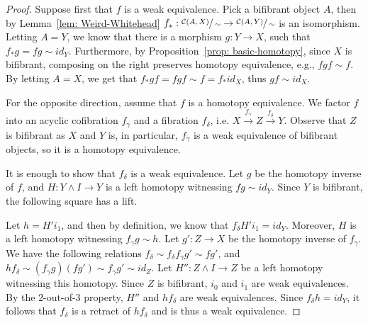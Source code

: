 \documentclass[../thesis.tex]{subfiles}
\begin{document}
            \begin{proof}
                Suppose first that $f$ is a weak equivalence. Pick a bifibrant object $A$, then by Lemma~\ref{lem: Weird-Whitehead} $f_*:\sfrac{\mathcal{C}(A,X)}{\sim}\rightarrow \sfrac{\mathcal{C}(A,Y)}{\sim}$ is an isomorphism. Letting $A = Y$, we know that there is a morphism $g: Y\rightarrow X$, such that $f_*g = fg \sim id_Y$. Furthermore, by Proposition~\ref{prop: basic-homotopy}, since $X$ is bifibrant, composing on the right preserves homotopy equivalence, e.g., $fgf \sim f$. By letting $A = X$, we get that $f_*gf = fgf \sim f = f_*id_X$, thus $gf \sim id_X$.

                For the opposite direction, assume that $f$ is a homotopy equivalence. We factor $f$ into an acyclic cofibration $f_\gamma$ and a fibration $f_\delta$, i.e. $X \overset{f_\gamma}{\rightarrow} Z \overset{f_\delta}{\rightarrow} Y$. Observe that $Z$ is bifibrant as $X$ and $Y$ is, in particular, $f_\gamma$ is a weak equivalence of bifibrant objects, so it is a homotopy equivalence. 

                It is enough to show that $f_\delta$ is a weak equivalence. Let $g$ be the homotopy inverse of $f$, and $H: Y\wedge I \rightarrow Y$ is a left homotopy witnessing $fg \sim id_Y$. Since $Y$ is bifibrant, the following square has a lift.
                \begin{center}
                \end{center}
                Let $h = H'i_1$, and then by definition, we know that $f_\delta H'i_1 = id_Y$. Moreover, $H$ is a left homotopy witnessing $f_\gamma g \sim h$. Let $g': Z\rightarrow X$ be the homotopy inverse of $f_\gamma$. We have the following relations $f_\delta \sim f_\delta f_\gamma g' \sim fg'$, and $hf_\delta \sim (f_\gamma g)(fg') \sim f_\gamma g' \sim id_Z$. Let $H'':Z\wedge I\rightarrow Z$ be a left homotopy witnessing this homotopy. Since $Z$ is bifibrant, $i_0$ and $i_1$ are weak equivalences. By the $2$-out-of-$3$ property, $H''$ and $hf_\delta$ are weak equivalences. Since $f_\delta h = id_Y$, it follows that $f_\delta$ is a retract of $h f_\delta$ and is thus a weak equivalence.
            \end{proof}
\end{document}
